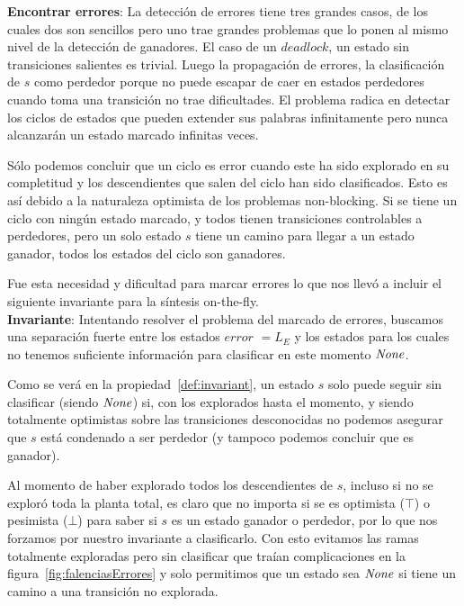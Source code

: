 \textbf{Encontrar errores}: La detección de errores tiene tres grandes casos, de los cuales dos son sencillos pero uno trae grandes problemas que lo ponen al mismo nivel de la detección de ganadores. El caso de un $deadlock$, un estado sin transiciones salientes es trivial. Luego la propagación de errores, la clasificación de $s$ como perdedor porque no puede escapar de caer en estados perdedores cuando toma una transición no trae dificultades. El problema radica en detectar los ciclos de estados que pueden extender sus palabras infinitamente pero nunca alcanzarán un estado marcado infinitas veces. 

Sólo podemos concluir que un ciclo es error cuando este ha sido explorado en su completitud y los descendientes que salen del ciclo han sido clasificados. Esto es así debido a la naturaleza optimista de los problemas non-blocking. Si se tiene un ciclo con ningún estado marcado, y todos tienen transiciones controlables a perdedores, pero un solo estado $s$ tiene un camino para llegar a un estado ganador, todos los estados del ciclo son ganadores. %

Fue esta necesidad y dificultad para marcar errores lo que nos llevó a incluir el siguiente invariante para la síntesis on-the-fly.\\

\textbf{Invariante}: Intentando resolver el problema del marcado de errores, buscamos una separación fuerte entre los estados $error$ $= L_E$ y los estados para los cuales no tenemos suficiente información para clasificar en este momento $\mathit{None}$.

Como se verá en la propiedad~\ref{def:invariant}, un estado $s$ solo puede seguir sin clasificar (siendo $\mathit{None}$) si, con los explorados hasta el momento, y siendo totalmente optimistas sobre las transiciones desconocidas no podemos asegurar que $s$ está condenado a ser perdedor (y tampoco podemos concluir que es ganador).

Al momento de haber explorado todos los descendientes de $s$, incluso si no se exploró toda la planta total, es claro que no importa si se es optimista ($\top$) o pesimista ($\bot$) para saber si $s$ es un estado ganador o perdedor, por lo que nos forzamos por nuestro invariante a clasificarlo. Con esto evitamos las ramas totalmente exploradas pero sin clasificar que traían complicaciones en la figura~\ref{fig:falenciasErrores} y solo permitimos que un estado sea $\mathit{None}$ si tiene un camino a una transición no explorada.

